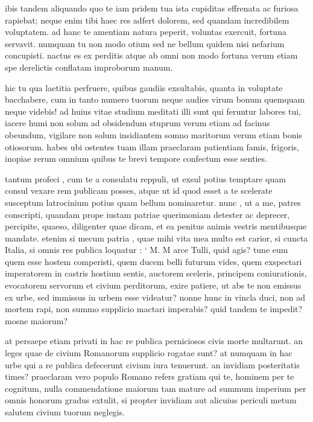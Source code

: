  ibis tandem aliquando quo te iam pridem tua ista cupiditas effrenata ac furiosa rapiebat; neque enim tibi haec res adfert dolorem, sed quandam incredibilem voluptatem. ad hanc te amentiam natura peperit, voluntas exercuit, fortuna servavit. numquam tu non modo otium sed ne bellum quidem nisi nefarium concupisti. nactus es ex perditis atque ab omni non modo fortuna verum etiam spe derelictis conflatam improborum manum.

 hic tu qua laetitia perfruere, quibus gaudiis exsultabis, quanta in voluptate bacchabere, cum in tanto numero tuorum neque audies virum bonum quemquam neque videbis! ad huius vitae studium meditati illi sunt qui feruntur labores tui, iacere humi non solum ad obsidendum stuprum verum etiam ad facinus obeundum, vigilare non solum insidiantem somno maritorum verum etiam bonis otiosorum. habes ubi ostentes tuam illam praeclaram patientiam famis, frigoris, inopiae rerum omnium quibus te brevi tempore confectum esse senties.

 tantum profeci , cum te a consulatu reppuli, ut exsul potius temptare quam consul vexare rem publicam posses, atque ut id quod esset a te scelerate susceptum latrocinium potius quam bellum nominaretur. nunc , ut a me, patres conscripti, quandam prope iustam patriae querimoniam detester ac deprecer, percipite, quaeso, diligenter quae dicam, et ea penitus animis vestris mentibusque mandate. etenim si mecum patria , quae mihi vita mea multo est carior, si cuncta Italia, si omnis res publica loquatur : ` M. M arce Tulli, quid agis? tune eum quem esse hostem comperisti, quem ducem belli futurum vides, quem exspectari imperatorem in castris hostium sentis, auctorem sceleris, principem coniurationis, evocatorem servorum et civium perditorum, exire patiere, ut abs te non emissus ex urbe, sed immissus in urbem esse videatur? nonne hunc in vincla duci, non ad mortem rapi, non summo supplicio mactari imperabis? quid tandem te impedit? mosne maiorum?

 at persaepe etiam privati in hac re publica perniciosos civis morte multarunt. an leges quae de civium Romanorum supplicio rogatae sunt? at numquam in hac urbe qui a re publica defecerunt civium iura tenuerunt. an invidiam posteritatis times? praeclaram vero populo Romano refers gratiam qui te, hominem per te cognitum, nulla commendatione maiorum tam mature ad summum imperium per omnis honorum gradus extulit, si propter invidiam aut alicuius periculi metum salutem civium tuorum neglegis.

